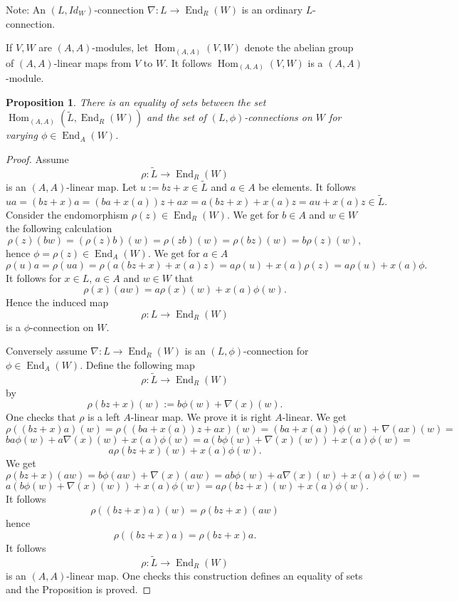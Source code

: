 \documentclass{amsart}
\theoremstyle{plain}
\newtheorem{proposition}[theorem]{Proposition}
\theoremstyle{definition}
\theoremstyle{remark}
\numberwithin{equation}{theorem}
\begin{document}
Note: An $(L,Id_W)$-connection $\nabla:L\rightarrow {\operatorname{End} }_{R}(W)$ is an ordinary $L$-connection.

If $V,W$ are $({A},{A})$-modules, let ${\operatorname{Hom} }_{({A},{A})}(V,W)$ denote the abelian group of $({A},{A})$-linear
maps from $V$ to $W$. It follows ${\operatorname{Hom} }_{({A},{A})}(V,W)$ is a $({A},{A})$-module.

\begin{proposition} There is an equality of sets between the set ${\operatorname{Hom} }_{({A},{A})}({\tilde{L} }, {\operatorname{End} }_{R}(W))$ and the set
of $(L,\phi)$-connections on $W$ for varying $\phi \in {\operatorname{End} }_{A}(W)$.
\end{proposition}
\begin{proof}Assume 
\[ \rho: {\tilde{L} }\rightarrow {\operatorname{End} }_{R}(W) \]
is an $({A},{A})$-linear map. Let $u:=bz+x\in {\tilde{L} }$ and $a\in {A}$ be elements.
It follows
\[ ua=(bz+x)a=(ba+x(a))z+ax=a(bz+x)+x(a)z =au+x(a)z \in {\tilde{L} }.\]
Consider the endomorphism $\rho(z)\in {\operatorname{End} }_{R}(W)$. We get for $b\in {A}$ and $w\in W$ the following calculation
\[ \rho(z)(bw)=(\rho(z)b)(w)=\rho(zb)(w)=\rho(bz)(w)=b\rho(z)(w),\]
hence $\phi= \rho(z) \in{\operatorname{End} }_{A}(W)$.
We get for $a\in {A}$
\[\rho(u)a=\rho(ua)=\rho(a(bz+x)+x(a)z)=a\rho(u)+x(a)\rho(z)=a\rho(u)+x(a)\phi.\]
It follows for $x\in L$, $a\in {A}$ and $w\in W$ that
\[ \rho(x)(aw)=a\rho(x)(w)+x(a)\phi(w).\]
Hence the induced map
\[\rho:L\rightarrow {\operatorname{End} }_{R}(W) \]
is a $\phi$-connection on $W$.

Conversely assume $\nabla:L\rightarrow {\operatorname{End} }_{R}(W)$ is an $(L,\phi)$-connection for $\phi\in {\operatorname{End} }_{A}(W)$.
Define the following map
\[\rho:{\tilde{L} }\rightarrow {\operatorname{End} }_{R}(W)\]
by
\[ \rho(bz+x)(w):=b\phi(w)+\nabla(x)(w).\]
One checks that $\rho$ is a left ${A}$-linear map.
We prove it is right ${A}$-linear.
We get
\[ \rho((bz+x)a)(w)=\rho((ba+x(a))z+ax)(w)=(ba+x(a))\phi(w)+\nabla(ax)(w)=\]
\[ba\phi(w)+a\nabla(x)(w)+x(a)\phi(w)=a(b\phi(w)+\nabla(x)(w))+x(a)\phi(w)=\]
\[ a\rho(bz+x)(w)+x(a)\phi(w).\]
We get
\[\rho(bz+x)(aw)=b\phi(aw)+\nabla(x)(aw)=ab\phi(w)+a\nabla(x)(w)+x(a)\phi(w)=\]
\[a(b\phi(w)+\nabla(x)(w))+x(a)\phi(w)=a\rho(bz+x)(w)+x(a)\phi(w).\]
It follows
\[ \rho((bz+x)a)(w)=\rho(bz+x)(aw)\]
hence
\[\rho((bz+x)a)=\rho(bz+x)a.\]
It follows 
\[\rho:{\tilde{L} }\rightarrow {\operatorname{End} }_{R}(W)\]
is an $({A},{A})$-linear map. One checks this construction defines an equality of sets and the Proposition is proved.
\end{proof}
\end{document}
